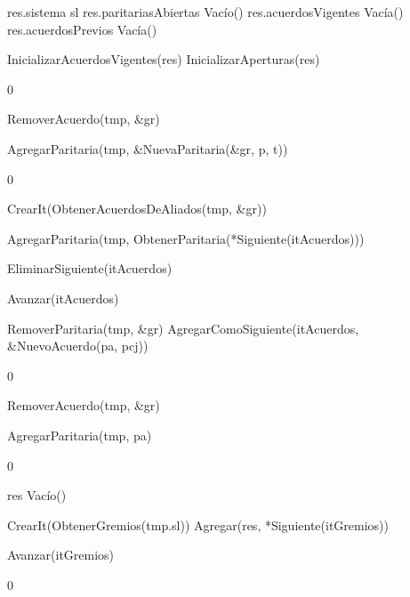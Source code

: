 {
	\state res.sistema \asig sl						
	\state res.paritariasAbiertas \asig Vacío()		
	\state res.acuerdosVigentes \asig Vacía()		
	\state res.acuerdosPrevios \asig Vacía()		
	\state

	\state InicializarAcuerdosVigentes(res)			
	\state InicializarAperturas(res)				
}
{0}
{\addtocounter{lipsumcounter}{1}}

{
							
		\state RemoverAcuerdo(tmp, \&gr)							
	\endif
	\state

	\state AgregarParitaria(tmp, \&NuevaParitaria(\&gr, p, t))		
}
{0}
{\addtocounter{lipsumcounter}{1}}

{

	\state {} \asig CrearIt(ObtenerAcuerdosDeAliados(tmp, \&gr))		
			
		\state

		\state AgregarParitaria(tmp, ObtenerParitaria(*Siguiente(itAcuerdos)))		

		\state EliminarSiguiente(itAcuerdos)										

		\state
		\state Avanzar(itAcuerdos)													
	\endwhile
	\state

	\state {} \asig RemoverParitaria(tmp, \&gr)		
	\state AgregarComoSiguiente(itAcuerdos, \&NuevoAcuerdo(pa, pcj))			
}
{0}
{\addtocounter{lipsumcounter}{1}}

{
	\state {} \asig RemoverAcuerdo(tmp, \&gr)			

	\state AgregarParitaria(tmp, pa)											
}
{0}
{\addtocounter{lipsumcounter}{1}}

{
	\state res \asig Vacío()								

	\state
	\state {} \asig CrearIt(ObtenerGremios(tmp.sl))						
					
		\state
		\state Agregar(res, *Siguiente(itGremios))			

		\state
		\state Avanzar(itGremios)						
	\endwhile
}
{0}
{\addtocounter{lipsumcounter}{1}}

